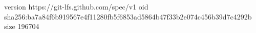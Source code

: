 version https://git-lfs.github.com/spec/v1
oid sha256:ba7a84f6b919567e4f11280fb5f6853ad5864b47f33b2e074c456b39d7c4292b
size 196704
